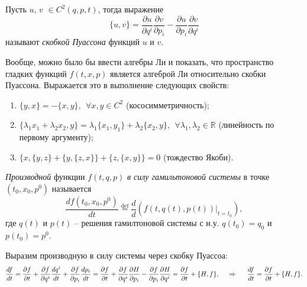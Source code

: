 \begin{to_def} 
    Пусть $u$, $v$ $\in C^2(q, p, t)$, тогда выражение
    \begin{equation*}
        \{u, v\}  
        =
        \frac{\partial u}{\partial q^i} \frac{\partial v}{\partial p_i} -
        \frac{\partial u}{\partial p_i} \frac{\partial v}{\partial q^i}
    \end{equation*}  
    называют \textit{скобкой Пуассона} функций $u$ и $v$.
\end{to_def}

Вообще, можно было бы ввести алгебры Ли и показать, что пространство гладких функций $f(t, x, p)$ является алгеброй Ли относительно скобки Пуассона. Выражается это в выполнение следующих свойств:
\begin{enumerate}
    \item $\{y, x\} = - \{x, y\}, \ \ \forall x, y \in C^2$ (кососимметричность);
    \item $\{\lambda_1 x_1 + \lambda_2 x_2, y\} = \lambda_1 \{x_1, y_1\} + \lambda_2 \{x_2, y\},
    \ \ \forall \lambda_1, \lambda_2 \in \mathbb{R}
    $ (линейность по первому аргументу);
    \item $\{x, \{y, z\} + \{y, \{z, x\}\} + \{z, \{x, y\}\} = 0$ (тождество Якоби).
\end{enumerate}

\begin{to_def} 
    \textit{Производной} функции $f(t, q, p)$ \textit{в силу гамильтоновой системы} в точке $(t_0, x_0, p^0)$ называется
    \begin{equation*}
         \frac{d f(t_0, x_0, p^0)}{d t} \overset{\mathrm{def}}{=} \frac{d }{d } 
         \left(
            f(t, q(t), p(t)) \big|_{t=t_0}
         \right),
     \end{equation*} 
     где $q(t)$ и $p(t)$ -- решения гамилтоновой системы с н.у. $q(t_0) = q_0$ и $p(t_0) = p^0$. 
\end{to_def}

Выразим производную в силу системы через скобку Пуассоа:
\begin{equation*}
    \frac{d f}{d t} 
    =
     \frac{\partial f}{\partial t} + \frac{\partial f}{\partial q^i} \frac{d q^i}{d t} + \frac{\partial f}{\partial p_i} \frac{d p_i}{d t} 
     =
      \frac{\partial f}{\partial t} + \frac{\partial f}{\partial q^i} \frac{\partial H}{\partial p_i} - \frac{\partial f}{\partial p_i} \frac{\partial H}{\partial q^i} = \frac{\partial f}{\partial t} + \{H, f\},
      \hspace{0.5cm} \Rightarrow \hspace{0.5cm} 
      \frac{d f}{d t} = \frac{\partial f}{\partial t} + \{H, f\}.
\end{equation*}

